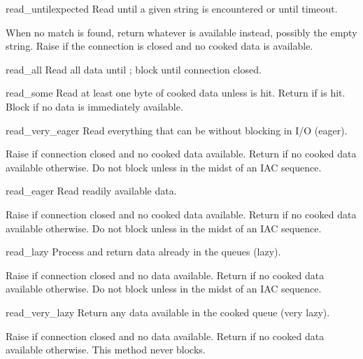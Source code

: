 \begin{methoddesc}{read_until}{expected}
Read until a given string is encountered or until timeout.

When no match is found, return whatever is available instead,
possibly the empty string.  Raise  if the connection
is closed and no cooked data is available.
\end{methoddesc}

\begin{methoddesc}{read_all}{}
Read all data until \EOF{}; block until connection closed.
\end{methoddesc}

\begin{methoddesc}{read_some}{}
Read at least one byte of cooked data unless \EOF{} is hit.
Return  if \EOF{} is hit.  Block if no data is immediately
available.
\end{methoddesc}

\begin{methoddesc}{read_very_eager}{}
Read everything that can be without blocking in I/O (eager).

Raise  if connection closed and no cooked data
available.  Return  if no cooked data available otherwise.
Do not block unless in the midst of an IAC sequence.
\end{methoddesc}

\begin{methoddesc}{read_eager}{}
Read readily available data.

Raise  if connection closed and no cooked data
available.  Return  if no cooked data available otherwise.
Do not block unless in the midst of an IAC sequence.
\end{methoddesc}

\begin{methoddesc}{read_lazy}{}
Process and return data already in the queues (lazy).

Raise  if connection closed and no data available.
Return  if no cooked data available otherwise.  Do not block
unless in the midst of an IAC sequence.
\end{methoddesc}

\begin{methoddesc}{read_very_lazy}{}
Return any data available in the cooked queue (very lazy).

Raise  if connection closed and no data available.
Return  if no cooked data available otherwise.  This method
never blocks.
\end{methoddesc}

